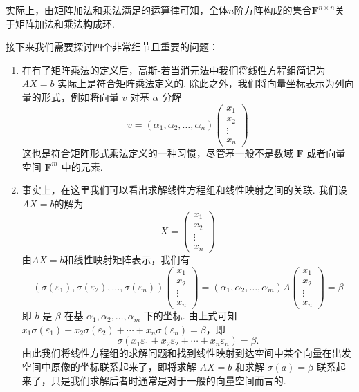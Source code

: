 实际上，由矩阵加法和乘法满足的运算律可知，全体$n$阶方阵构成的集合$\mathbf{F}^{n\times n}$关于矩阵加法和乘法构成环.

接下来我们需要探讨四个非常细节且重要的问题：
\begin{enumerate}
    \item 在有了矩阵乘法的定义后，高斯-若当消元法中我们将线性方程组简记为 $AX = b$ 实际上是符合矩阵乘法定义的. 除此之外，我们将向量坐标表示为列向量的形式，例如将向量 $v$ 对基 $\alpha$ 分解
          \[v=(\alpha_1,\alpha_2,\ldots,\alpha_n)\begin{pmatrix}
                  x_1 \\ x_2 \\ \vdots \\ x_n
              \end{pmatrix}\]
          这也是符合矩阵形式乘法定义的一种习惯，尽管基一般不是数域 $\mathbf{F}$ 或者向量空间 $\mathbf{F}^m$ 中的元素.

    \item 事实上，在这里我们可以看出求解线性方程组和线性映射之间的关联. 我们设$AX=b$的解为
          \[X=\begin{pmatrix}
                  x_1 \\ x_2 \\ \vdots \\ x_n
              \end{pmatrix}\]
          由$AX=b$和线性映射矩阵表示，我们有
          \begin{equation}\label{eq:7:方程组与核空间1}
              (\sigma(\varepsilon_1),\sigma(\varepsilon_2),\ldots,\sigma(\varepsilon_n))\begin{pmatrix}
                  x_1 \\ x_2 \\ \vdots \\ x_n
              \end{pmatrix}=(\alpha_1,\alpha_2,\ldots,\alpha_m)A\begin{pmatrix}
                  x_1 \\ x_2 \\ \vdots \\ x_n
              \end{pmatrix}=\beta
          \end{equation}
          即 $b$ 是 $\beta$ 在基 $\alpha_1,\alpha_2,\ldots,\alpha_m$ 下的坐标. 由上式可知 $x_1\sigma(\varepsilon_1)+x_2\sigma(\varepsilon_2)+\cdots+x_n\sigma(\varepsilon_n)=\beta$，即
          \begin{equation}\label{eq:7:方程组与核空间2}
              \sigma(x_1\varepsilon_1+x_2\varepsilon_2+\cdots+x_n\varepsilon_n)=\beta.
          \end{equation}
          由此我们将线性方程组的求解问题和找到线性映射到达空间中某个向量在出发空间中原像的坐标联系起来了，即将求解 $AX = b$ 和求解 $\sigma(a) = \beta$ 联系起来了，只是我们求解后者时通常是对于一般的向量空间而言的.


\end{enumerate}
